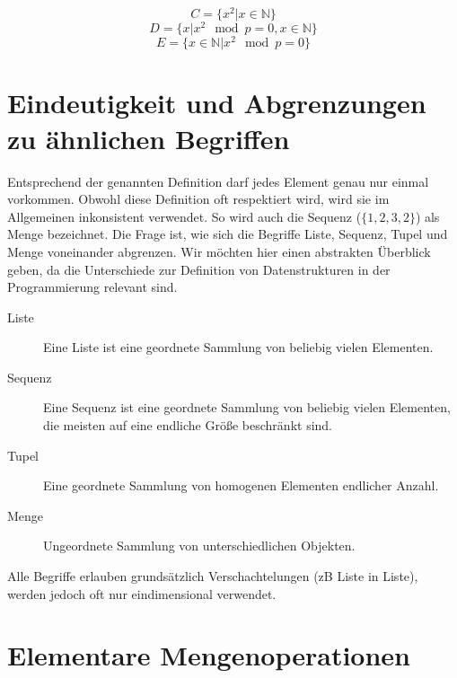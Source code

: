 \[
    C = \{x^2 | x \in \mathbb{N}\}
\] \[
    D = \{x | x^2 \mod{p} = 0, x \in \mathbb{N}\}
\] \[
    E = \{x \in \mathbb{N} | x^2 \mod{p} = 0\}
\]

\section{Eindeutigkeit und Abgrenzungen zu ähnlichen Begriffen}
%
Entsprechend der genannten Definition darf jedes Element genau nur einmal vorkommen. Obwohl diese Definition oft respektiert wird, wird sie im Allgemeinen inkonsistent verwendet. So wird auch die Sequenz ($\{1, 2, 3, 2\}$) als Menge bezeichnet. Die Frage ist, wie sich die Begriffe Liste, Sequenz, Tupel und Menge voneinander abgrenzen. Wir möchten hier einen abstrakten Überblick geben, da die Unterschiede zur Definition von Datenstrukturen in der Programmierung relevant sind.
%
\begin{description}
 \item[Liste] Eine Liste ist eine geordnete Sammlung von beliebig vielen Elementen.
 \item[Sequenz] Eine Sequenz ist eine geordnete Sammlung von beliebig vielen Elementen,
                die meisten auf eine endliche Größe beschränkt sind.
 \item[Tupel] Eine geordnete Sammlung von homogenen Elementen endlicher Anzahl.
 \item[Menge] Ungeordnete Sammlung von unterschiedlichen Objekten.
\end{description}

Alle Begriffe erlauben grundsätzlich Verschachtelungen (zB Liste in Liste),
werden jedoch oft nur eindimensional verwendet.

\section{Elementare Mengenoperationen}
%
